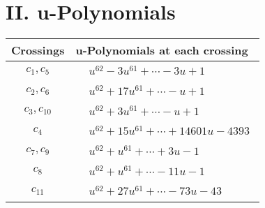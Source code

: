 \documentclass[1p]{elsarticle_modified}
\theoremstyle{definition}
\begin{document}
\newpage\renewcommand{\arraystretch}{1}
\centering \section*{ II. u-Polynomials}
\begin{tabular}{m{50pt}|m{274pt}}
Crossings & \hspace{64pt}u-Polynomials at each crossing \\
\hline $$\begin{aligned}c_{1},c_{5}\end{aligned}$$&$\begin{aligned}
&u^{62}-3 u^{61}+\cdots-3 u+1
\end{aligned}$\\
\hline $$\begin{aligned}c_{2},c_{6}\end{aligned}$$&$\begin{aligned}
&u^{62}+17 u^{61}+\cdots- u+1
\end{aligned}$\\
\hline $$\begin{aligned}c_{3},c_{10}\end{aligned}$$&$\begin{aligned}
&u^{62}+3 u^{61}+\cdots- u+1
\end{aligned}$\\
\hline $$\begin{aligned}c_{4}\end{aligned}$$&$\begin{aligned}
&u^{62}+15 u^{61}+\cdots+14601 u-4393
\end{aligned}$\\
\hline $$\begin{aligned}c_{7},c_{9}\end{aligned}$$&$\begin{aligned}
&u^{62}+u^{61}+\cdots+3 u-1
\end{aligned}$\\
\hline $$\begin{aligned}c_{8}\end{aligned}$$&$\begin{aligned}
&u^{62}+u^{61}+\cdots-11 u-1
\end{aligned}$\\
\hline $$\begin{aligned}c_{11}\end{aligned}$$&$\begin{aligned}
&u^{62}+27 u^{61}+\cdots-73 u-43
\end{aligned}$\\
\hline
\end{tabular}\newpage\renewcommand{\arraystretch}{1}
\end{document}
